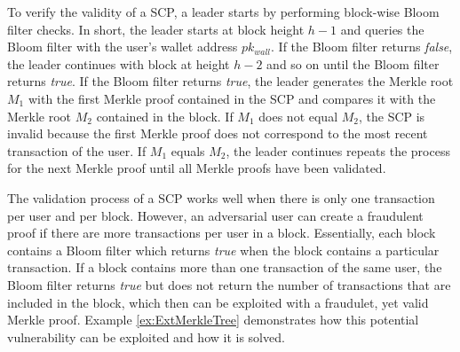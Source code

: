 To verify the validity of a SCP, a leader starts by performing block-wise Bloom filter checks. In short, the leader starts at block height $h - 1$ and queries the Bloom filter with the user's wallet address $pk_{wall}$. If the Bloom filter returns \textit{false}, the leader continues with block at height $h - 2$ and so on until the Bloom filter returns \textit{true}. If the Bloom filter returns \textit{true}, the leader generates the Merkle root $M_1$ with the first Merkle proof contained in the SCP and compares it with the Merkle root $M_2$ contained in the block. If $M_1$ does not equal $M_2$, the SCP is invalid because the first Merkle proof does not correspond to the most recent transaction of the user. If $M_1$ equals $M_2$, the leader continues repeats the process for the next Merkle proof until all Merkle proofs have been validated.

The validation process of a SCP works well when there is only one transaction per user and per block. However, an adversarial user can create a fraudulent proof if there are more transactions per user in a block. Essentially, each block contains a Bloom filter which returns \textit{true} when the block contains a particular transaction. If a block contains more than one transaction of the same user, the Bloom filter returns \textit{true} but does not return the number of transactions that are included in the block, which then can be exploited with a fraudulet, yet valid Merkle proof. Example \ref{ex:ExtMerkleTree} demonstrates how this potential vulnerability can be exploited and how it is solved.

